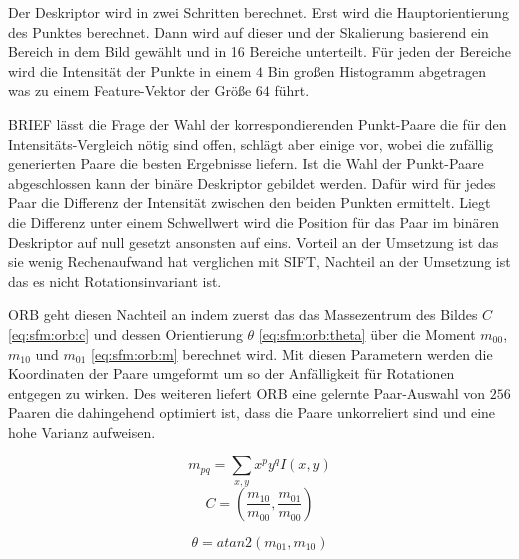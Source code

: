 \documentclass[12pt,titlepage, twoside]{article}
\begin{document}
Der Deskriptor wird in zwei Schritten berechnet. Erst wird die Hauptorientierung des Punktes berechnet. Dann wird auf dieser und der Skalierung basierend ein Bereich in dem Bild gewählt und in 16 Bereiche unterteilt.
Für jeden der Bereiche wird die Intensität der Punkte in einem $4$ Bin großen Histogramm abgetragen was zu einem Feature-Vektor der Größe $64$ führt.


BRIEF lässt die Frage der Wahl der korrespondierenden Punkt-Paare die für den Intensitäts-Vergleich nötig sind offen, schlägt aber einige vor, wobei die zufällig generierten Paare die besten Ergebnisse liefern.
Ist die Wahl der Punkt-Paare abgeschlossen kann der binäre Deskriptor gebildet werden. Dafür wird für jedes Paar die Differenz der Intensität zwischen den beiden Punkten ermittelt. 
Liegt die Differenz unter einem Schwellwert wird die Position für das Paar im binären Deskriptor auf null gesetzt ansonsten auf eins.
Vorteil an der Umsetzung ist das sie wenig Rechenaufwand hat verglichen mit SIFT, Nachteil an der Umsetzung ist das es nicht Rotationsinvariant ist.

ORB geht diesen Nachteil an indem zuerst das das Massezentrum des Bildes $C$ \ref{eq:sfm:orb:c} und dessen Orientierung $\theta$ \ref{eq:sfm:orb:theta} 
über die Moment $m_{00}$, $m_{10}$ und $m_{01}$ \ref{eq:sfm:orb:m} berechnet wird.
Mit diesen Parametern werden die Koordinaten der Paare umgeformt um so der Anfälligkeit für Rotationen entgegen zu wirken. 
Des weiteren liefert ORB eine gelernte Paar-Auswahl von $256$ Paaren die dahingehend optimiert ist, dass die Paare unkorreliert sind und eine hohe Varianz aufweisen.

\begin{equation}
    \label{eq:sfm:orb:m}
    m_{pq} = \sum_{x,y}{x^py^qI(x,y)}
\end{equation}
\begin{equation}
    \label{eq:sfm:orb:c}
    C = ( \frac{m_{10}}{m_{00}}, \frac{m_{01}}{m_{00}} )
\end{equation}

\begin{equation}
    \label{eq:sfm:orb:theta}
    \theta = atan2(m_{01},m_{10})
\end{equation}
\end{document}
